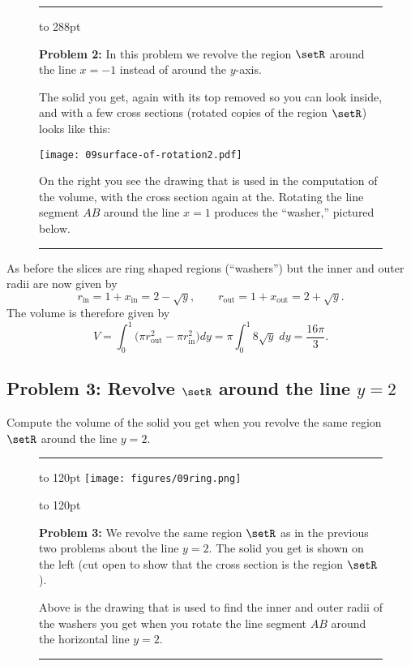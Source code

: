 \begin{figure}[hbt]
  \centering \rule[8pt]{\textwidth}{1pt}
  \begin{minipage}[b]{130pt}
    \vbox to 288pt{\footnotesize\sffamily%
      \centerline{  }

      \smallskip

      \textbf{Problem 2: } In this problem we revolve the region $\setR$ around
      the line $x=-1$ instead of around the $y$-axis.

      The solid you get, again with its top removed so you can look inside, and
      with a few cross sections (rotated copies of the region $\setR$) looks
      like this: \vfill

    \texttt{[image: 09surface-of-rotation2.pdf]}
    \vfill

    On the right you see the drawing that is used in the computation of the
    volume, with the cross section again at the.  Rotating the line segment $AB$
    around the line $x=1$ produces the ``washer,'' pictured below.  }
\end{minipage}%
\begin{minipage}[b]{220pt}
  \sffamily\centering 
\end{minipage}
\rule{\textwidth}{1pt}

\end{figure}
As before the slices are ring shaped regions (``washers'') but the inner and
outer radii are now given by
\[
r_{\textrm{in}} = 1+x_{\textrm{in}} = 2-\sqrt y,\qquad r_{\textrm{out}} =
1+x_{\textrm{out}} = 2+\sqrt y.
\]
The volume is therefore given by
\[
V=\int_0^1 \bigl(\pi r_{\textrm{out}}^2-\pi r_{\textrm{in}}^2\bigr)dy
=\pi\int_0^1 8\sqrt y\; dy =\frac{16\pi}3.
\]


\subsection{Problem 3: Revolve $\setR$ around the line $y=2$}
Compute the volume of the solid you get when you revolve the same region $\setR$
around the line $y=2$.

\begin{figure}[h]
  \rule{\textwidth}{1pt} \sffamily\centering
  

      \parbox{144pt}{ \vbox to 120pt{
          \texttt{[image: figures/09ring.png]}} } \qquad
      \parbox{130pt}{\vbox to 120pt{\footnotesize\sffamily%
      \textbf{Problem 3:} We revolve the same region $\setR$ as in the previous
      two problems about the line $y=2$.  The solid you get is shown on the left
      (cut open to show that the cross section is the region $\setR$).
      
      Above is the drawing that is used to find the inner and outer radii of 
      the washers you get when you rotate the line segment $AB$ around the
      horizontal line $y=2$.}}  \rule{\textwidth}{1pt}
      
\end{figure}

